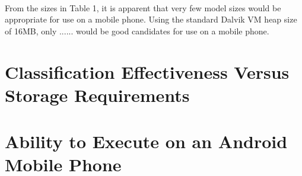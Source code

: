 	
	
	\paragraph*{}  From the sizes in Table 1, it is apparent that very few model sizes would be appropriate for use on a mobile phone.  Using the standard Dalvik VM heap size of 16MB, only ...... would be good candidates for use on a mobile phone.

\section{Classification Effectiveness Versus Storage Requirements}


\section{Ability to Execute on an Android Mobile Phone}

